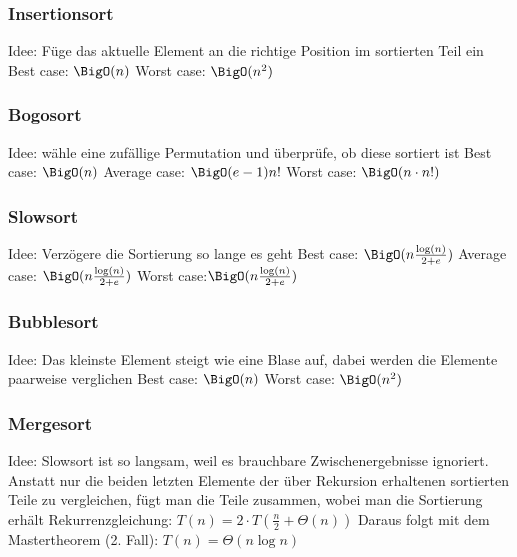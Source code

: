 	\subsubsection{Insertionsort}
	Idee: Füge das aktuelle Element an die richtige Position im sortierten Teil ein \newline \newline
	Best case: $\BigO(n)$ \newline
	Worst case: $\BigO(n^2)$
	\subsubsection{Bogosort}
	Idee: wähle eine zufällige Permutation und überprüfe, ob diese sortiert ist \newline \newline
	Best case: $\BigO(n)$ \newline
	Average case: $\BigO(e-1)n!$ \newline
	Worst case: $\BigO(n\cdot n!)$
	\subsubsection{Slowsort}
	Idee: Verzögere die Sortierung so lange es geht \newline \newline
	Best case: $\BigO(n\frac{\log(n)}{2+e})$ \newline
	Average case: $\BigO(n\frac{\log(n)}{2+e})$ \newline
	Worst case:$\BigO(n\frac{\log(n)}{2+e})$
	\subsubsection{Bubblesort}
	Idee: Das kleinste Element steigt wie eine Blase auf, dabei werden die Elemente paarweise verglichen \newline \newline
	Best case: $\BigO(n)$ \newline
	Worst case: $\BigO(n^2)$
	\subsubsection{Mergesort}
	Idee: Slowsort ist so langsam, weil es brauchbare Zwischenergebnisse ignoriert. Anstatt nur die beiden  letzten Elemente der über Rekursion erhaltenen sortierten Teile zu vergleichen, fügt man die Teile zusammen, wobei man die Sortierung erhält \newline \newline
	Rekurrenzgleichung: $T(n)=2\cdot T(\frac{n}{2}+\Theta(n))$ \newline
	Daraus folgt mit dem Mastertheorem (2. Fall): $T(n)=\Theta(n\log n)$
